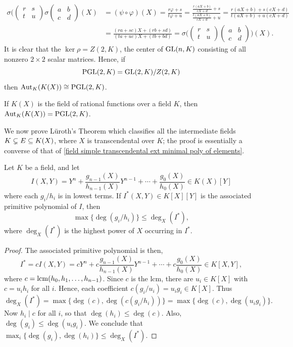 \begin{align*}
\sigma(\begin{pmatrix}
r&s\\
t&u
\end{pmatrix}\sigma\begin{pmatrix}
a&b\\
c&d
\end{pmatrix}(X)&=(\psi\circ\varphi)(X)=\frac{r\varphi+s}{t\varphi+u}=\frac{\frac{r(aX+b)}{cX+d}+s}{\frac{t(aX+b)}{cX+d}+u}=\frac{r(aX+b)+s(cX+d)}{t(aX+b)+u(cX+d)}\\
&=\frac{(ra+sc)X+(rb+sd)}{(ta+uc)X+(tb+bd)}=\sigma\Big(\begin{pmatrix}
r&s\\
t&u
\end{pmatrix}\begin{pmatrix}
a&b\\
c&d
\end{pmatrix}\Big)(X).
\end{align*}
It is clear that the $\ker\rho=Z(2,K)$, the center of $\mathrm{GL}(n,K)$ consisting of all nonzero $2\times 2$ scalar matrices. Hence, if
\[\mathrm{PGL}(2,K)=\mathrm{GL}(2,K)/Z(2,K)\]
then $\mathrm{Aut}_K(K(X))\cong\mathrm{PGL}(2,K)$.
\begin{corollary}
If $K(X)$ is the field of rational functions over a field $K$, then $\mathrm{Aut}_K(K(X))=\mathrm{PGL}(2,K)$.
\end{corollary}
We now prove L\"uroth's Theorem which classifies all the intermediate fields $K\subsetneq E\subseteq K(X)$, where $X$ is transcendental over $K$; the proof is essentially a converse of that of \cref{field simple transcendental ext minimal poly of elements}.
\begin{lemma}\label{Luroth's Theorem lemma}
Let $K$ be a field, and let
\[I(X,Y)=Y^n+\frac{g_{n-1}(X)}{h_{n-1}(X)}Y^{n-1}+\cdots+\frac{g_0(X)}{h_0(X)}\in K(X)[Y]\]
where each $g_i/h_i$ is in lowest terms. If $I^*(X,Y)\in K[X][Y]$ is the associated primitive polynomial of $I$, then
\[\max\{\deg(g_i/h_i)\}\leq\deg_X(I^*),\]
where $\deg_X(I^*)$ is the highest power of $X$ occurring in $I^*$.
\end{lemma}
\begin{proof}
The associated primitive polynomial is then,
\[I^*=cI(X,Y)=cY^n+c\frac{g_{n-1}(X)}{h_{n-1}(X)}Y^{n-1}+\cdots+c\frac{g_0(X)}{h_0(X)}\in K[X,Y],\]
where $c=\mathrm{lcm}(h_0,h_1,\dots,h_{n-1})$. Since $c$ is the lcm, there are $u_i\in K[X]$ with $c=u_ih_i$ for all $i$. Hence, each coefficient $c(g_i/u_i)=u_ig_i\in K[X]$. Thus
\[\deg_X(I^*)=\max\{\deg(c),\deg(c(g_i/h_i))\}=\max\{\deg(c),\deg(u_ig_i)\}.\]
Now $h_i\mid c$ for all $i$, so that $\deg(h_i)\leq\deg(c)$. Also, $\deg(g_i)\leq\deg(u_ig_i)$. We conclude that $\max_i\{\deg(g_i),\deg(h_i)\}\leq\deg_X(I^*)$.
\end{proof}
